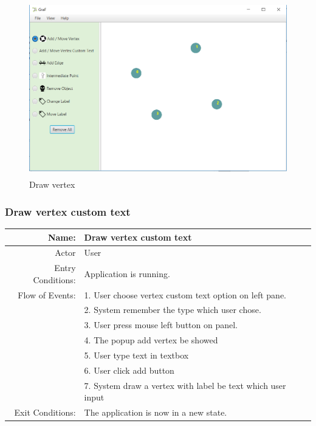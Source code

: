 \documentclass[a4paper,10pt]{article}
\begin{document}
	\paragraph{}
	
\begin{figure}[H]
		\centering
		\includegraphics[height = 3in]{drawVertex.png}
		\caption[Optional caption]{Draw vertex}
		\label{fig:Repository}
	\end{figure}
\paragraph{}
\subsubsection{Draw vertex custom text}
	\begin{tabular}{|r|l|}
\hline
Name: & Draw vertex custom text \\
\hline
Actor & User \\
\hline
Entry Conditions: & Application is running. \\
\hline
Flow of Events: & 1. User choose vertex custom text option on left pane. \\


& 2. System remember the type which user chose.  \\
& 3. User press mouse left button on panel.  \\
& 4. The popup add vertex be showed  \\
& 5. User type text in textbox  \\
& 6. User click add button  \\
& 7. System draw a vertex with label be text which user input   \\
\hline
Exit Conditions: & The application is now in a new state. \\
\hline

\end{tabular}
\end{document}
